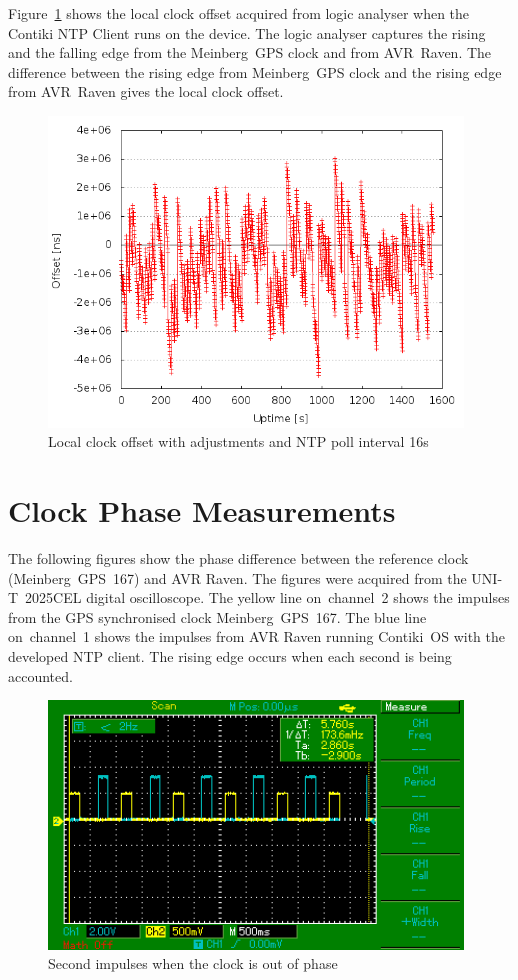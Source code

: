 Figure~\ref{fig:app-ntp-la} shows the local clock offset
acquired from logic analyser when the Contiki NTP Client runs on the device.
The logic analyser captures the rising and the falling edge
from the Meinberg~GPS clock and from AVR~Raven.
The difference between the rising edge from
Meinberg~GPS clock and the rising edge from AVR~Raven gives the local clock offset.
\begin{figure}[H]
  \centering
  \includegraphics[width=11cm,keepaspectratio]{fig/la.png}
  \caption{Local clock offset with adjustments and NTP poll interval 16s}
  \label{fig:app-ntp-la}
\end{figure}


\chapter{Clock Phase Measurements}\label{app:phase}
The following figures show the phase difference between
the reference clock (Meinberg~GPS~167) and AVR Raven.
The figures were acquired from the UNI-T~2025CEL digital oscilloscope.
The yellow line on~channel~2 shows the impulses from the GPS synchronised clock Meinberg~GPS~167.
The blue line on~channel~1 shows the impulses from AVR Raven running
Contiki~OS with the developed NTP client.
The rising edge occurs when each second is being accounted.
\begin{figure}[H]
  \centering
  \includegraphics[width=11cm,keepaspectratio]{fig/osc-out-of-phase.png}
  \caption{Second impulses when the clock is out of phase}
  \label{fig:app-osc-out-of-phase}
  \bigskip
\end{figure}

